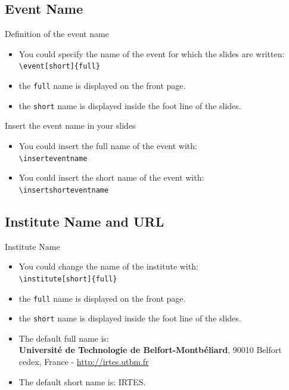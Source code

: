 \documentclass[english,circlenumberstyle]{irtesbeamer}
\begin{document}
\subsection{Event Name}
\begin{frame}{\subsecname}
	\begin{block}{Definition of the event name}
		\begin{itemize}
		\item You could specify the name of the event for which the slides are written: \\
			\texttt{{\textbackslash}event[short]\{full\}}
		\item the \texttt{full} name is displayed on the front page.
		\item the \texttt{short} name is displayed inside the foot line of the slides.
		\end{itemize}
	\end{block}
	\begin{block}{Insert the event name in your slides}
		\begin{itemize}
		\item You could insert the full name of the event with: \\
			\texttt{{\textbackslash}inserteventname}
		\item You could insert the short name of the event with: \\
			\texttt{{\textbackslash}insertshorteventname}
		\end{itemize}
	\end{block}
\end{frame}

\subsection{Institute Name and URL}

\begin{frame}{Institute Name}
	\begin{itemize}
	\item You could change the name of the institute with: \\
		\texttt{{\textbackslash}institute[short]\{full\}}
	\item the \texttt{full} name is displayed on the front page.
	\item the \texttt{short} name is displayed inside the foot line of the slides.
	\item The default full name is: \\
		\textbf{Universit\'e de Technologie de Belfort-Montb\'eliard}, 90010 Belfort cedex, France - \url{http://irtes.utbm.fr}
	\item The default short name is: IRTES.
	\end{itemize}
\end{frame}
\end{document}
